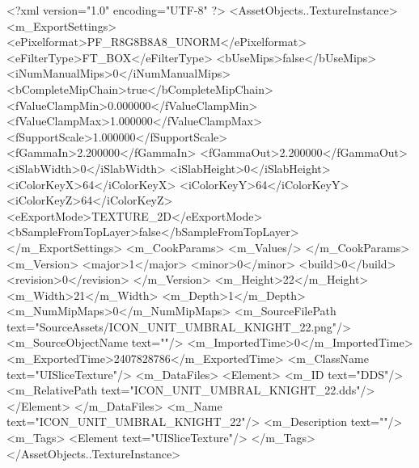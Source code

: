 <?xml version="1.0" encoding="UTF-8" ?>
<AssetObjects..TextureInstance>
	<m_ExportSettings>
		<ePixelformat>PF_R8G8B8A8_UNORM</ePixelformat>
		<eFilterType>FT_BOX</eFilterType>
		<bUseMips>false</bUseMips>
		<iNumManualMips>0</iNumManualMips>
		<bCompleteMipChain>true</bCompleteMipChain>
		<fValueClampMin>0.000000</fValueClampMin>
		<fValueClampMax>1.000000</fValueClampMax>
		<fSupportScale>1.000000</fSupportScale>
		<fGammaIn>2.200000</fGammaIn>
		<fGammaOut>2.200000</fGammaOut>
		<iSlabWidth>0</iSlabWidth>
		<iSlabHeight>0</iSlabHeight>
		<iColorKeyX>64</iColorKeyX>
		<iColorKeyY>64</iColorKeyY>
		<iColorKeyZ>64</iColorKeyZ>
		<eExportMode>TEXTURE_2D</eExportMode>
		<bSampleFromTopLayer>false</bSampleFromTopLayer>
	</m_ExportSettings>
	<m_CookParams>
		<m_Values/>
	</m_CookParams>
	<m_Version>
		<major>1</major>
		<minor>0</minor>
		<build>0</build>
		<revision>0</revision>
	</m_Version>
	<m_Height>22</m_Height>
	<m_Width>21</m_Width>
	<m_Depth>1</m_Depth>
	<m_NumMipMaps>0</m_NumMipMaps>
	<m_SourceFilePath text="SourceAssets/ICON_UNIT_UMBRAL_KNIGHT_22.png"/>
	<m_SourceObjectName text=""/>
	<m_ImportedTime>0</m_ImportedTime>
	<m_ExportedTime>2407828786</m_ExportedTime>
	<m_ClassName text="UISliceTexture"/>
	<m_DataFiles>
		<Element>
			<m_ID text="DDS"/>
			<m_RelativePath text="ICON_UNIT_UMBRAL_KNIGHT_22.dds"/>
		</Element>
	</m_DataFiles>
	<m_Name text="ICON_UNIT_UMBRAL_KNIGHT_22"/>
	<m_Description text=""/>
	<m_Tags>
		<Element text="UISliceTexture"/>
	</m_Tags>
</AssetObjects..TextureInstance>

